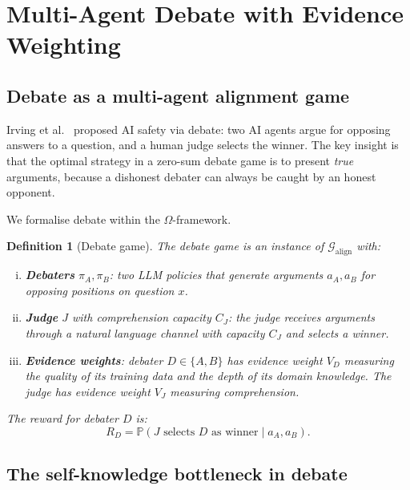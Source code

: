 \documentclass[11pt,a4paper]{article}
\newtheorem{definition}[theorem]{Definition}
\newcommand{\Prob}{\mathbb{P}}
\begin{document}
\section{Multi-Agent Debate with Evidence Weighting}
\label{sec:debate}

\subsection{Debate as a multi-agent alignment game}

Irving et al.~\cite{irving2018} proposed AI safety via debate: two AI agents argue for opposing answers to a question, and a human judge selects the winner. The key insight is that the optimal strategy in a zero-sum debate game is to present \emph{true} arguments, because a dishonest debater can always be caught by an honest opponent.

We formalise debate within the $\Omega$-framework.

\begin{definition}[Debate game]
\label{def:debate-game}
The debate game is an instance of $\mathcal{G}_{\mathrm{align}}$ with:
\begin{enumerate}[(i)]
    \item \textbf{Debaters} $\pi_A, \pi_B$: two LLM policies that generate arguments $a_A, a_B$ for opposing positions on question $x$.
    \item \textbf{Judge} $J$ with comprehension capacity $C_J$: the judge receives arguments through a natural language channel with capacity $C_J$ and selects a winner.
    \item \textbf{Evidence weights}: debater $D \in \{A, B\}$ has evidence weight $V_D$ measuring the quality of its training data and the depth of its domain knowledge. The judge has evidence weight $V_J$ measuring comprehension.
\end{enumerate}
The reward for debater $D$ is:
\begin{equation}
    R_D = \Prob(J \text{ selects } D \text{ as winner} \mid a_A, a_B).
\end{equation}
\end{definition}

\subsection{The self-knowledge bottleneck in debate}
\end{document}
